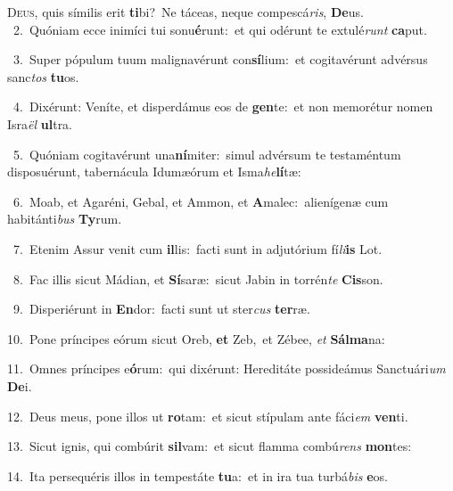 \lettrine{\initial\textcolor{\initialcolor}{D}}{eus,} quis símilis erit \textbf{ti}\-bi?~\star Ne táceas, neque compescá\-\textit{ris}\-, \textbf{De}\-us.\\
{\numbfont\textcolor{\numbcolor}{~2.}}~Quóniam ecce inimíci tui sonu\-\textbf{é}\-runt:~\star et qui odérunt te extulé\textit{runt} \textbf{ca}\-put.\par
{\numbfont\textcolor{\numbcolor}{~3.}}~Super pópulum tuum malignavérunt con\-\textbf{sí}\-lium:~\star et cogitavérunt advérsus sanc\textit{tos} \textbf{tu}\-os.\par
{\numbfont\textcolor{\numbcolor}{~4.}}~Dixérunt: Veníte, et disperdámus eos de \textbf{gen}\-te:~\star et non memorétur nomen Isra\textit{ël} \textbf{ul}\-tra.\par
{\numbfont\textcolor{\numbcolor}{~5.}}~Quóniam cogitavérunt una\-\textbf{ní}\-miter:~\star simul advérsum te testaméntum disposuérunt, tabernácula Idumæórum et Isma\-\textit{he}\-\textbf{lí}tæ:\par
{\numbfont\textcolor{\numbcolor}{~6.}}~Moab, et Agaréni, Gebal, et Ammon, et \textbf{A}\-malec:~\star alienígenæ cum habitánti\textit{bus} \textbf{Ty}\-rum.\par
{\numbfont\textcolor{\numbcolor}{~7.}}~Etenim Assur venit cum \textbf{il}\-lis:~\star facti sunt in adjutórium fí\-\textit{li}\-\textbf{is} Lot.\par
{\numbfont\textcolor{\numbcolor}{~8.}}~Fac illis sicut Mádian, et \textbf{Sí}\-saræ:~\star sicut Jabin in torrén\textit{te} \textbf{Cis}\-son.\par
{\numbfont\textcolor{\numbcolor}{~9.}}~Disperiérunt in \textbf{En}\-dor:~\star facti sunt ut ster\textit{cus} \textbf{ter}\-ræ.\par
{\numbfont\textcolor{\numbcolor}{10.}}~Pone príncipes eórum sicut Oreb, \textbf{et} Zeb,~\star et Zébee, \textit{et} \textbf{Sál}\-\textbf{ma}na:\par
{\numbfont\textcolor{\numbcolor}{11.}}~Omnes príncipes e\-\textbf{ó}\-rum:~\star qui dixérunt: Hereditáte possideámus Sanctuári\textit{um} \textbf{De}\-i.\par
{\numbfont\textcolor{\numbcolor}{12.}}~Deus meus, pone illos ut \textbf{ro}\-tam:~\star et sicut stípulam ante fáci\textit{em} \textbf{ven}\-ti.\par
{\numbfont\textcolor{\numbcolor}{13.}}~Sicut ignis, qui combúrit \textbf{sil}\-vam:~\star et sicut flamma combú\textit{rens} \textbf{mon}\-tes:\par
{\numbfont\textcolor{\numbcolor}{14.}}~Ita persequéris illos in tempestáte \textbf{tu}\-a:~\star et in ira tua turbá\textit{bis} \textbf{e}\-os.\par
